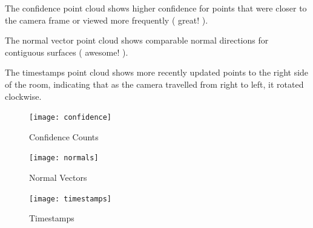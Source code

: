 \documentclass[12pt]{article}
\begin{document}
The confidence point cloud shows higher confidence for points that were closer to the camera frame or viewed more frequently ( great! ). 
  
The normal vector point cloud shows comparable normal directions for contiguous surfaces ( awesome! ).

The timestamps point cloud shows more recently updated points to the right side of the room, indicating that as the camera travelled from right to left, it rotated clockwise.

\begin{figure}[H]
\centering
\texttt{[image: confidence]}
\caption{ Confidence Counts } 
\label{fig:confidence}
\end{figure}   

\begin{figure}[H]
\centering
\texttt{[image: normals]}
\caption{ Normal Vectors } 
\label{fig:normals}
\end{figure}   

\begin{figure}[H]
\centering
\texttt{[image: timestamps]}
\caption{ Timestamps } 
\label{fig:timestamps}
\end{figure}   
\end{document}
